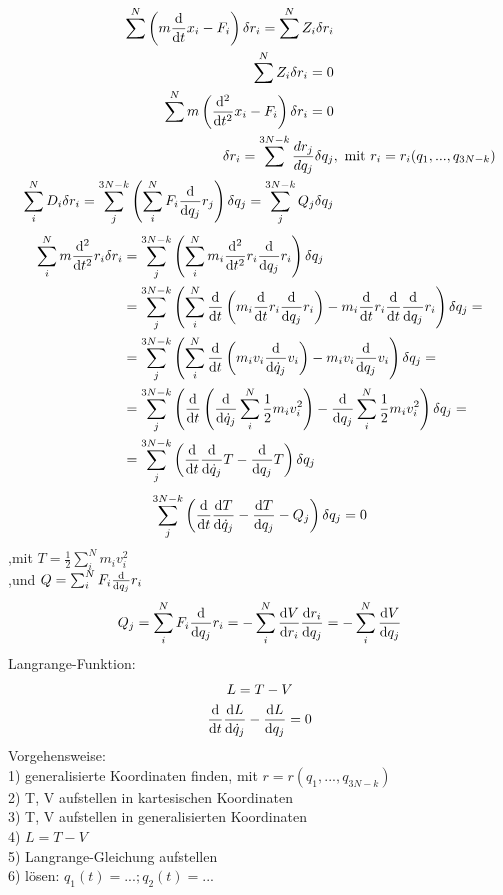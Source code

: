     \begin{align*}
      \sum^N \left( m \ableitung{t} x_i -F_i\right) \delta r_i = \sum^N Z_i \delta r_i &\\
      \sum^N Z_i \delta r_i= 0 &\\
      \sum^N m \left(\ableitungii{t} x_i -F_i \right) \delta r_i= 0 &\\
      \delta r_i= \sum^{3N-k} \frac{dr_j}{dq_j} \delta q_j&, \mathrm{~mit ~} r_i=r_i(q_1, ... , q_{3N-k}) \\
      \sum_i^N D_i \delta r_i = \sum_j^{3N-k} \left( \sum_i^N F_i \ableitung{q_j} r_j \right) \delta q_j =  \sum_j^{3N-k} Q_j \delta q_j &
      \end{align*}
      \begin{align*}
      \sum_i^N m \ableitungii{t} r_i \delta r_i &= \sum_j^{3N-k} \left( \sum_i^N m_i \ableitungii{t} r_i \ableitung{q_j} r_i \right) \delta q_j \\
      &= \sum_j^{3N-k} \left( \sum_i^N \ableitung{t} \left( m_i \ableitung{t} r_i \ableitung{q_j} r_i \right) - m_i \ableitung{t} r_i \ableitung{t} \ableitung{q_j} r_i \right) \delta q_j = \\
      &= \sum_j^{3N-k} \left( \sum_i^N \ableitung{t} \left( m_i v_i \ableitung{\dot q_j} v_i \right) - m_i v_i \ableitung{q_j} v_i \right) \delta q_j= \\
      &= \sum_j^{3N-k} \left( \ableitung{t} \left( \ableitung{\dot q_j} \sum_i^N \frac{1}{2} m_i v_i^2 \right) - \ableitung{q_j} \sum_i^N \frac{1}{2} m_i v_i^2 \right) \delta q_j = \\
      &= \sum_j^{3N-k} \left( \ableitung{t} \ableitung{\dot q_j} T - \ableitung{q_j} T \right) \delta q_j \\
    \end{align*}
    \begin{equation}
      \sum_j^{3N-k} \left( \ableitung{t} \ableitungv{\dot q_j}{T} - \ableitungv{q_j}{T} - Q_j \right) \delta q_j= 0 
    \end{equation}
      ,mit $ T=\frac{1}{2} \sum_i^N m_i v_i^2$ \\
      ,und $Q = \sum_i^N F_i \ableitung{q_j} r_i$
    \begin{equation}
      Q_j = \sum_i^N F_i \ableitung{q_j} r_i
      = -\sum_i^N \ableitungv{r_i}{V} \ableitungv{q_j}{r_i} 
      = -\sum_i^N \ableitungv{q_j}{V}
    \end{equation}
    Langrange-Funktion:
    \begin{gather}
      L =T-V \\
      \ableitung{t} \ableitungv{\dot q_j}{L} - \ableitungv{q_j}{L} = 0
    \end{gather}
Vorgehensweise: \\
    1) generalisierte Koordinaten finden, mit $r=r\left(q_1, ..., q_{3N-k}\right)$ \\
    2) T, V aufstellen in kartesischen Koordinaten \\
    3) T, V aufstellen in generalisierten Koordinaten \\
    4) $L=T-V$ \\
    5) Langrange-Gleichung aufstellen \\
    6) lösen: $q_1(t) =...; q_2(t) =...$
